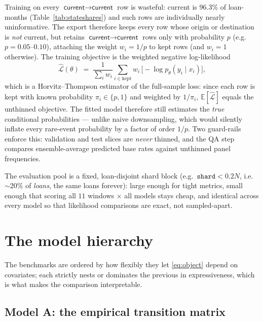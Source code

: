 \documentclass[11pt,a4paper]{article}
\newcommand{\E}{\mathbb{E}}
\newcommand{\code}[1]{\texttt{#1}}
\newcommand{\state}[1]{\textsf{#1}}
\begin{document}
Training on every $\state{current}\!\to\!\state{current}$ row is wasteful: \state{current} is $96.3\%$ of loan-months (Table~\ref{tab:stateshares}) and such rows are individually nearly uninformative. The export therefore keeps every row whose origin or destination is \emph{not} \state{current}, but retains $\state{current}\!\to\!\state{current}$ rows only with probability $p$ (e.g.\ $p = 0.05$--$0.10$), attaching the weight $w_i = 1/p$ to kept rows (and $w_i=1$ otherwise). The training objective is the weighted negative log-likelihood
\begin{equation}
\label{eq:weightednll}
\widehat{\mathcal{L}}(\theta) \;=\; \frac{1}{\sum_i w_i}\sum_{i \in \text{kept}} w_i\,
\bigl[-\log p_\theta\!\left(y_i \mid x_i\right)\bigr],
\end{equation}
which is a Horvitz--Thompson estimator of the full-sample loss: since each row is kept with known probability $\pi_i \in \{p, 1\}$ and weighted by $1/\pi_i$, $\E[\widehat{\mathcal{L}}] $ equals the unthinned objective. The fitted model therefore still estimates the \emph{true} conditional probabilities --- unlike naive downsampling, which would silently inflate every rare-event probability by a factor of order $1/p$. Two guard-rails enforce this: validation and test slices are \emph{never} thinned, and the QA step compares ensemble-average predicted base rates against unthinned panel frequencies.

The evaluation pool is a fixed, loan-disjoint shard block (e.g.\ $\code{shard} < 0.2N$, i.e.\ $\sim$20\% of \emph{loans}, the same loans forever): large enough for tight metrics, small enough that scoring all $11$ windows $\times$ all models stays cheap, and identical across every model so that likelihood comparisons are exact, not sampled-apart.

\section{The model hierarchy}\label{sec:models}

The benchmarks are ordered by how flexibly they let \eqref{eq:object} depend on covariates; each strictly nests or dominates the previous in expressiveness, which is what makes the comparison interpretable.

\subsection{Model A: the empirical transition matrix}
\end{document}
